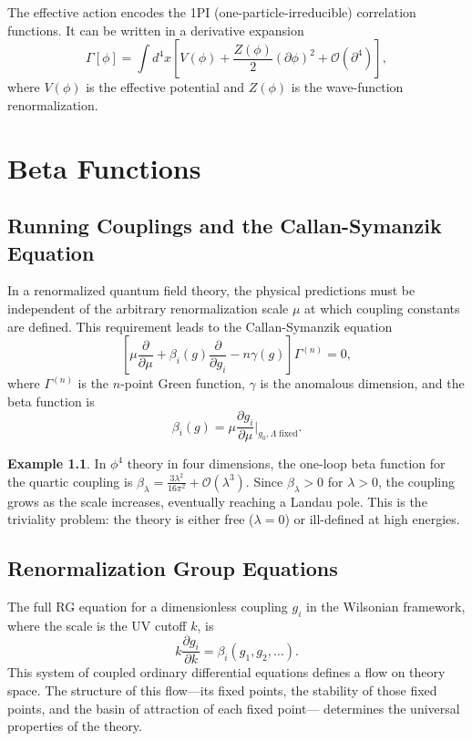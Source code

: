 \documentclass[12pt,a4paper,oneside]{book}
\theoremstyle{definition}
\newtheorem{example}{Example}[chapter]
\theoremstyle{plain}
\theoremstyle{remark}
\begin{document}
The effective action encodes the 1PI (one-particle-irreducible) correlation
functions. It can be written in a derivative expansion
\begin{equation}
\Gamma[\phi] = \int d^4x\left[V(\phi) + \frac{Z(\phi)}{2}(\partial\phi)^2
+ \mathcal{O}(\partial^4)\right],
\end{equation}
where $V(\phi)$ is the effective potential and $Z(\phi)$ is the wave-function
renormalization.

\chapter{Beta Functions}

\section{Running Couplings and the Callan-Symanzik Equation}

In a renormalized quantum field theory, the physical predictions must be
independent of the arbitrary renormalization scale $\mu$ at which coupling
constants are defined. This requirement leads to the Callan-Symanzik equation
\begin{equation}
\left[\mu\frac{\partial}{\partial\mu} + \beta_i(g)\frac{\partial}{\partial g_i}
- n\gamma(g)\right]\Gamma^{(n)} = 0,
\end{equation}
where $\Gamma^{(n)}$ is the $n$-point Green function, $\gamma$ is the anomalous
dimension, and the beta function is
\begin{equation}
\beta_i(g) = \mu\frac{\partial g_i}{\partial\mu}\bigg|_{g_0, \Lambda\;\text{fixed}}.
\end{equation}

\begin{example}
In $\phi^4$ theory in four dimensions, the one-loop beta function for the
quartic coupling is $\beta_\lambda = \frac{3\lambda^2}{16\pi^2} + \mathcal{O}(\lambda^3)$.
Since $\beta_\lambda > 0$ for $\lambda > 0$, the coupling grows as the scale
increases, eventually reaching a Landau pole. This is the triviality problem:
the theory is either free ($\lambda = 0$) or ill-defined at high energies.
\end{example}

\section{Renormalization Group Equations}

The full RG equation for a dimensionless coupling $g_i$ in the Wilsonian
framework, where the scale is the UV cutoff $k$, is
\begin{equation}
k\frac{\partial g_i}{\partial k} = \beta_i(g_1, g_2, \ldots).
\end{equation}
This system of coupled ordinary differential equations defines a flow on
theory space. The structure of this flow---its fixed points, the stability
of those fixed points, and the basin of attraction of each fixed point---
determines the universal properties of the theory.
\end{document}
